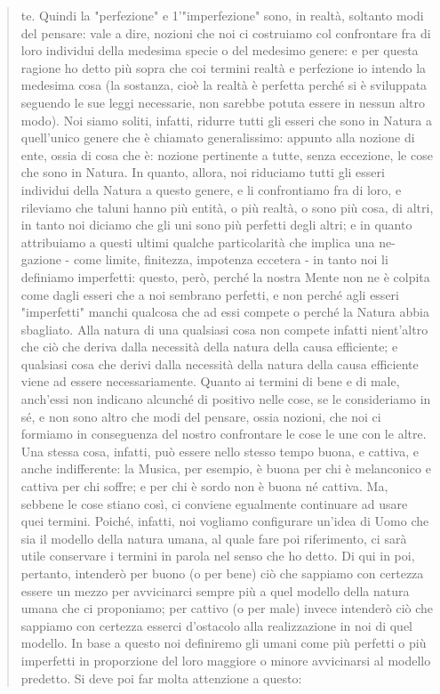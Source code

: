 \begin{quotation}
	te. Quindi la "perfezione" e 1’"imperfezione" sono, in realtà, soltanto modi del pensare: vale a dire, nozioni che noi ci costruiamo col confrontare fra di loro individui della medesima
	specie o del medesimo genere: e per questa ragione ho detto più sopra che coi
	termini realtà e perfezione io intendo la medesima cosa (la sostanza, cioè la realtà è perfetta perché si è sviluppata seguendo le sue leggi necessarie, non sarebbe potuta essere in nessun altro modo). Noi siamo soliti, infatti, ridurre
	tutti gli esseri che sono in Natura a quell’unico genere che è chiamato generalissimo: appunto alla nozione di ente, ossia di cosa che è: nozione pertinente a tutte, senza eccezione,
	le cose che sono in Natura. In quanto, allora, noi riduciamo tutti gli esseri individui della
	Natura a questo genere, e li confrontiamo fra di loro, e rileviamo che taluni hanno più entità, o più realtà, o sono più cosa, di altri, in tanto noi diciamo che gli uni sono più perfetti
	degli altri; e in quanto attribuiamo a questi ultimi qualche particolarità che implica una ne-
	gazione - come limite, finitezza, impotenza eccetera - in tanto noi li definiamo imperfetti:
	questo, però, perché la nostra Mente non ne è colpita come dagli esseri che a noi sembrano
	perfetti, e non perché agli esseri "imperfetti" manchi qualcosa che ad essi compete o perché
	la Natura abbia sbagliato. Alla natura di una qualsiasi cosa non compete infatti nient’altro
	che ciò che deriva dalla necessità della natura della causa efficiente; e qualsiasi cosa che derivi dalla necessità della natura della causa efficiente viene ad essere necessariamente.
	Quanto ai termini di bene e di male, anch’essi non indicano alcunché di positivo nelle cose, se le consideriamo in sé, e non sono altro che modi del pensare, ossia nozioni, che noi ci
	formiamo in conseguenza del nostro confrontare le cose le une con le altre. Una stessa cosa, infatti, può essere nello stesso tempo buona, e cattiva, e anche indifferente: la Musica,
	per esempio, è buona per chi è melanconico e cattiva per chi soffre; e per chi è sordo non è
	buona né cattiva. Ma, sebbene le cose stiano così, ci conviene egualmente continuare ad
	usare quei termini. Poiché, infatti, noi vogliamo configurare un’idea di Uomo che sia il modello della natura umana, al quale fare poi riferimento, ci sarà utile conservare i termini in
	parola nel senso che ho detto. Di qui in poi, pertanto, intenderò per buono (o per bene) ciò
	che sappiamo con certezza essere un mezzo per avvicinarci sempre più a quel modello della
	natura umana che ci proponiamo; per cattivo (o per male) invece intenderò ciò che sappiamo con certezza esserci d’ostacolo alla realizzazione in noi di quel modello. In base a questo noi definiremo gli umani come più perfetti o più imperfetti in proporzione del loro maggiore o minore avvicinarsi al modello predetto. Si deve poi far molta attenzione a questo:

\end{quotation}

